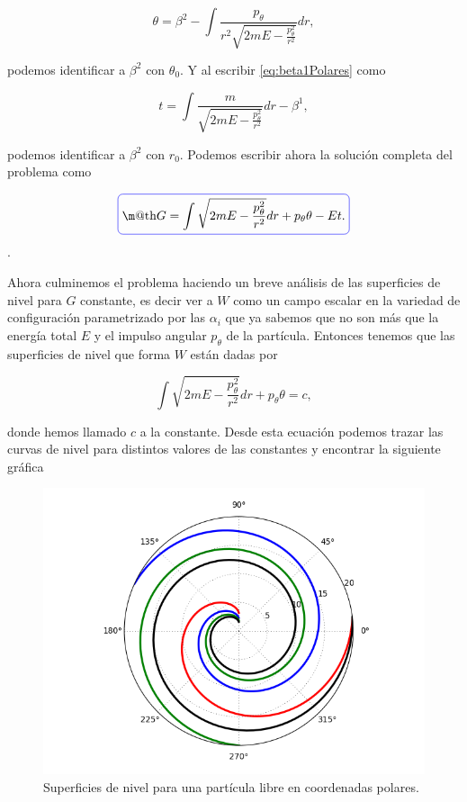 \documentclass[a4paper,10pt]{article}
\makeatletter
\numberwithin{equation}{section}
\newcommand*{\boxcolor}{blue}
\renewcommand{\boxed}[1]{\textcolor{\boxcolor}{%
\tikz[baseline={([yshift=-1ex]current bounding box.center)}] \node [rectangle, minimum width=1ex,rounded corners,draw] {\normalcolor\m@th$\displaystyle#1$};}}
\makeatother
\begin{document}
\begin{equation}
 \theta =   \beta^2  - \int \frac{p_\theta}{r^2\sqrt{2mE - \frac{p_\theta^2}{r^2}}}dr,
\end{equation}

podemos identificar a $\beta^2$ con $\theta_0$. Y al escribir \eqref{eq:beta1Polares} 
como 

\begin{equation}
 t = \int \frac{m}{\sqrt{2mE - \frac{p_\theta^2}{r^2}}}dr - \beta^1,
\end{equation}

podemos identificar a $\beta^2$ con $r_0$. Podemos escribir ahora la solución 
completa del problema como

\begin{equation}
 \boxed{G = \int \sqrt{2mE - \frac{p_\theta^2}{r^2}} dr + p_\theta\theta - Et.}
\end{equation}.

Ahora culminemos el problema haciendo un breve análisis de las superficies de nivel 
para $G$ constante, es decir ver a $W$ como un campo escalar en la variedad de 
configuración parametrizado por las $\alpha_i$ que ya sabemos que no son más que 
la energía total $E$ y el impulso angular $p_\theta$ de la partícula. Entonces tenemos 
que las superficies de nivel que forma $W$ están dadas por 

\begin{equation}
 \int \sqrt{2mE - \frac{p_\theta^2}{r^2}} dr + p_\theta\theta = c,
\end{equation}

donde hemos llamado $c$ a la constante. Desde esta ecuación podemos trazar las curvas 
de nivel para distintos valores de las constantes y encontrar la siguiente gráfica 

\begin{figure}[H]
 \center 
 \includegraphics[scale=0.4]{problema4fig1}
 \caption{Superficies de nivel para una partícula libre en coordenadas polares.}
 \label{fig:problema4fig1}
\end{figure}
\end{document}
